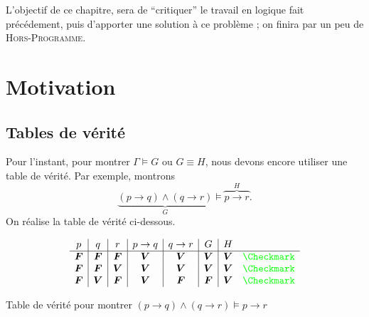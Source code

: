 L'objectif de ce chapitre, sera de ``critiquer'' le travail en logique fait précédement, puis d'apporter une solution à ce problème ; on finira par un peu de \textsc{Hors-Programme}.

\setcounter{section}{-1}

\section{Motivation}

\subsection{Tables de vérité}

Pour l'instant, pour montrer $\Gamma \models G$\/ ou $G \equiv H$, nous devons encore utiliser une table de vérité.
Par exemple, montrons \[
	\underbrace{(p \to q) \land (q \to r)}_G \models \overbrace{p\to r}^H
.\]
On réalise la table de vérité ci-dessous.

\begin{table}[H]
	\centering
	\[
		\begin{array}{c|c|c|c|c|c|cl}
			p&q&r&p\to q&q\to r&G&H\\ \hline
			\mathbf{F}&\mathbf{F}&\mathbf{F}&\mathbf{V}&\mathbf{V}&\mathbf{V}&\mathbf{V}&\gtk\\
			\mathbf{F}&\mathbf{F}&\mathbf{V}&\mathbf{V}&\mathbf{V}&\mathbf{V}&\mathbf{V}&\gtk\\
			\mathbf{F}&\mathbf{V}&\mathbf{F}&\mathbf{V}&\mathbf{F}&\mathbf{F}&\mathbf{V}&\gtk\\
		\end{array}
	\] 
	\caption{Table de vérité pour montrer $(p \to q) \land (q \to r) \models p\to r$\/}
\end{table}

